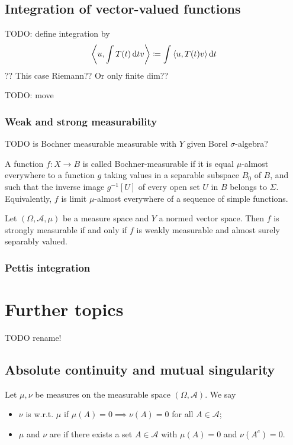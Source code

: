 \subsection{Integration of vector-valued functions}
TODO: define integration by
\[ \left\langle u, \int T(t)\operatorname{d \!}{t} v \right\rangle \coloneqq \int\left\langle u,T(t)v \right\rangle\operatorname{d \!}{t} \]
??
This case Riemann?? Or only finite dim??

TODO: move

\subsubsection{Weak and strong measurability}
TODO is Bochner measurable measurable with $Y$ given Borel $\sigma$-algebra?

A function $f:X\to B$ is called Bochner-measurable if it is equal $\mu$-almost everywhere to a function $g$ taking values in a separable subspace $B_{0}$ of $B$, and such that the inverse image $g^{-1}[U]$ of every open set $U$ in $B$ belongs to $\Sigma$. Equivalently, $f$ is limit $\mu$-almost everywhere of a sequence of simple functions. 

\begin{theorem}
Let $(\Omega, \mathcal{A},\mu)$ be a measure space and $Y$ a normed vector space. Then $f$ is strongly measurable \textup{if and only if} $f$ is weakly measurable and almost surely separably valued.
\end{theorem}



\subsubsection{Pettis integration}


\section{Further topics}
TODO rename!

\subsection{Absolute continuity and mutual singularity}
\begin{definition}
Let $\mu,\nu$ be measures on the measurable space $(\Omega,\mathcal{A})$. We say
\begin{itemize}
\item $\nu$ is  w.r.t. $\mu$ if $\mu(A)=0\implies \nu(A) = 0$ for all $A\in\mathcal{A}$;
\item $\mu$ and $\nu$ are  if there exists a set $A\in\mathcal{A}$ with $\mu(A) = 0$ and $\nu(A^c) = 0$.
\end{itemize}
\end{definition}

